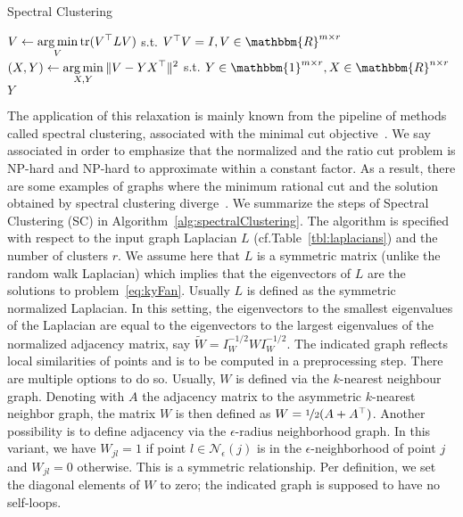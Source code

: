 \begin{algorithm}[t]
\caption{Spectral Clustering} 
\begin{algorithmic}[1]
   
  \State $\displaystyle V\gets \operatorname*{arg\,min}_{V}\operatorname*{tr}(V^\top LV)$ s.t. $V^\top V=I, V\in\mathbbm{R}^{m\times r}$ \label{alg:spectralClustering:eig}
  \State $\displaystyle (X,Y)\gets \operatorname*{arg\,min}_{X,Y}\|V-YX^\top\|^2$ s.t. $Y\in\mathbbm{1}^{m\times r}, X\in\mathbbm{R}^{n\times r}$ 
  \State \Return $Y$
  \EndFunction
\end{algorithmic}
\label{alg:spectralClustering}
\end{algorithm}
The application of this relaxation is mainly known from the pipeline of methods called spectral clustering, associated with the minimal cut objective~\citep{Luxburg2007tutorial}. We say associated in order to emphasize that the normalized and the ratio cut problem is NP-hard and NP-hard to approximate within a constant factor. As a result, there are some examples of graphs where the minimum rational cut and the solution obtained by spectral clustering diverge~\citep{guattery1998quality}.  We summarize the steps of Spectral Clustering (SC) in Algorithm~\ref{alg:spectralClustering}. The algorithm is specified with respect to the input graph Laplacian $L$ (cf.\@ Table~\ref{tbl:laplacians}) and the number of clusters $r$. We assume here that $L$ is a symmetric matrix (unlike the random walk Laplacian) which implies that the eigenvectors of $L$ are the solutions to problem~\eqref{eq:kyFan}. Usually $L$ is defined as the symmetric normalized Laplacian. In this setting, the eigenvectors to the smallest eigenvalues of the Laplacian are equal to the eigenvectors to the largest eigenvalues of the normalized adjacency matrix, say $\tilde{W}=I_W^{-1/2}WI_W^{-1/2}$. The indicated graph reflects local similarities of points and is to be computed in a preprocessing step. There are multiple options to do so. Usually, $W$ is defined via the $k$-nearest neighbour graph. Denoting with $A$ the adjacency matrix to the asymmetric $k$-nearest neighbor graph, the matrix $W$ is then defined as $W=\nicefrac{1}{2}(A+A^\top)$. Another possibility is to define adjacency via the $\epsilon$-radius neighborhood graph. In this variant, we have $W_{jl}=1$ if point $l\in\mathcal{N}_\epsilon(j)$ is in the $\epsilon$-neighborhood of point $j$ and $W_{jl}=0$ otherwise. This is a symmetric relationship. Per definition, we set the diagonal elements of $W$ to zero; the indicated graph is supposed to have no self-loops. 

